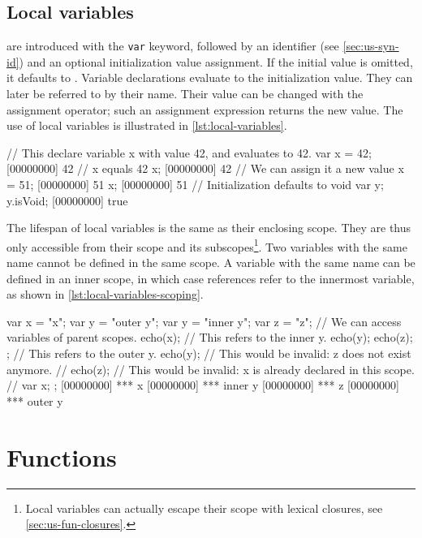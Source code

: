 \subsection{Local variables}

 are introduced with the \lstinline|var| keyword,
followed by an identifier (see \autoref{sec:us-syn-id}) and an optional
initialization value assignment. If the initial value is omitted, it
defaults to . Variable
declarations evaluate to
the initialization value. They can later be referred to by their
name. Their value can be changed with the assignment operator; such an
assignment expression returns the new value. The use of local
variables is illustrated in \autoref{lst:local-variables}.

\begin{urbiscript}[caption=Using local variables,
  label=lst:local-variables,float=\floatpos]
// This declare variable x with value 42, and evaluates to 42.
var x = 42;
[00000000] 42
// x equals 42
x;
[00000000] 42
// We can assign it a new value
x = 51;
[00000000] 51
x;
[00000000] 51
// Initialization defaults to void
var y;
y.isVoid;
[00000000] true
\end{urbiscript}

The lifespan of local variables is the same as their enclosing scope. They
are thus only accessible from their scope and its
subscopes\footnote{Local variables can actually escape their scope
  with lexical closures, see \autoref{sec:us-fun-closures}.}. Two
variables with the same name cannot be defined in the same scope. A
variable with the same name can be defined in an inner scope, in which
case references refer to the innermost variable, as shown in
\autoref{lst:local-variables-scoping}.

\begin{urbiscript}[caption=Local variables scoping,
  label=lst:local-variables-scoping,float=\floatpos]
{
  var x = "x";
  var y = "outer y";
  {
    var y = "inner y";
    var z = "z";
    // We can access variables of parent scopes.
    echo(x);
    // This refers to the inner y.
    echo(y);
    echo(z);
  };
  // This refers to the outer y.
  echo(y);
  // This would be invalid: z does not exist anymore.
  // echo(z);
  // This would be invalid: x is already declared in this scope.
  // var x;
};
[00000000] *** x
[00000000] *** inner y
[00000000] *** z
[00000000] *** outer y
\end{urbiscript}

\FloatBarrier
\section{Functions}

